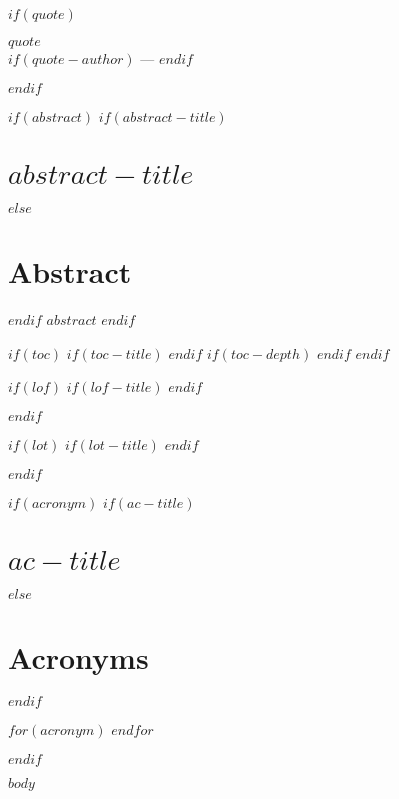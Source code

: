 \documentclass[
$if(fontsize)$
  $fontsize$,
$endif$
$if(lang)$
  $babel-lang$,
$endif$
$if(papersize)$
  $papersize$paper,
$endif$
$if(twoside)$
twoside,
$endif$
$if(openright)$
openright,
$endif$
$if(title)$
titlepage,
$endif$
numbers=noenddot,
headinclude,
footinclude,
cleardoublepage=empty,
abstract=on,
BCOR=5mm,
dvipsnames,
$for(classoption)$
  $classoption$$sep$,
$endfor$
]{scrreport}
\begin{document}
$if(quote)$
\cleardoublepage
\thispagestyle{empty}
\vspace*{3cm}
\begin{flushright}
\textit{$quote$}\\ \medskip
$if(quote-author)$        
--- 
$endif$
\end{flushright}
$endif$

$if(abstract)$
$if(abstract-title)$
\chapter*{$abstract-title$}
$else$
\chapter*{Abstract}
$endif$
$abstract$
$endif$

$if(toc)$
$if(toc-title)$
\renewcommand*\contentsname{$toc-title$}
$endif$
$if(toc-depth)$
\setcounter{tocdepth}{$toc-depth$}
$endif$
\tableofcontents
$endif$

$if(lof)$
$if(lof-title)$
\renewcommand*\listfigurename{$lof-title$}
$endif$
\listoffigures
$endif$

$if(lot)$
$if(lot-title)$
\renewcommand*\listtablename{$lot-title$}
$endif$
\listoftables
$endif$

$if(acronym)$
$if(ac-title)$
\chapter*{$ac-title$}
$else$
\chapter*{Acronyms}
$endif$
\begin{NoHyper}
\begin{acronym}[TDMA]
$for(acronym)$
$endfor$
\end{acronym}
\end{NoHyper}
\cleardoublepage
$endif$

\cleardoublepage
\pagestyle{scrheadings}

$body$
\end{document}
